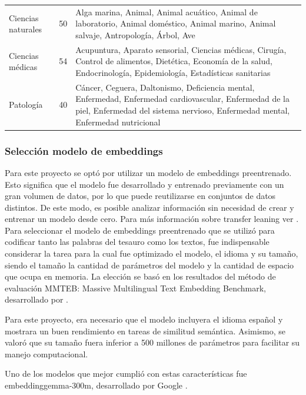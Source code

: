 \documentclass[11pt,a4paper]{article}
\begin{document}
{\begin{longtable}{p{3.5cm}P{2cm}p{9cm}}
			Ciencias naturales & 50 & Alga marina, Animal, Animal acuático, Animal de laboratorio, Animal doméstico, Animal marino, Animal salvaje, Antropología, Árbol, Ave \\
			
			Ciencias médicas & 54 & Acupuntura, Aparato sensorial, Ciencias médicas, Cirugía, Control de alimentos, Dietética, Economía de la salud, Endocrinología, Epidemiología, Estadísticas sanitarias \\
			
			Patología & 40 & Cáncer, Ceguera, Daltonismo, Deficiencia mental, Enfermedad, Enfermedad cardiovascular, Enfermedad de la piel, Enfermedad del sistema nervioso, Enfermedad mental, Enfermedad nutricional \\
			
		\end{longtable}
	}
	
	
	\subsubsection{Selección modelo de embeddings}
	
	Para este proyecto se optó por utilizar un modelo de embeddings preentrenado. Esto significa que el modelo fue desarrollado y entrenado previamente con un gran volumen de datos, por lo que puede reutilizarse en conjuntos de datos distintos. De este modo, es posible analizar información sin necesidad de crear y entrenar un modelo desde cero. Para más información sobre transfer leaning ver \cite{Hosna2022}.
	Para seleccionar el modelo de embeddings preentrenado que se utilizó para codificar tanto las palabras del tesauro como los textos, fue indispensable considerar la tarea para la cual fue optimizado el modelo, el idioma y su tamaño, siendo el tamaño la cantidad de parámetros del modelo y la cantidad de espacio que ocupa en memoria. La elección se basó en los resultados del método de evaluación MMTEB: Massive Multilingual Text Embedding Benchmark, desarrollado por \cite{enevoldsen2025mmtebmassivemultilingualtext}.

	Para este proyecto, era necesario que el modelo incluyera el idioma español y mostrara un buen rendimiento en tareas de similitud semántica. Asimismo, se valoró que su tamaño fuera inferior a 500 millones de parámetros para facilitar su manejo computacional.

	Uno de los modelos que mejor cumplió con estas características fue embeddinggemma-300m, desarrollado por Google \cite{vera2025embeddinggemmapowerfullightweighttext}.
\end{document}
